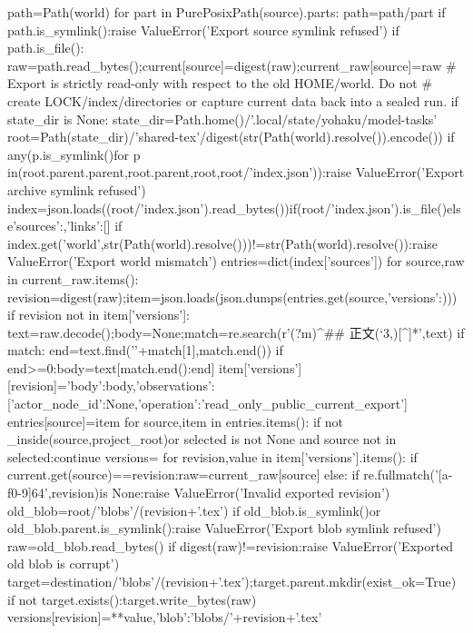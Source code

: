         path=Path(world)
        for part in PurePosixPath(source).parts:
            path=path/part
            if path.is_symlink():raise ValueError('Export source symlink refused')
        if path.is_file():
            raw=path.read_bytes();current[source]=digest(raw);current_raw[source]=raw
    # Export is strictly read-only with respect to the old HOME/world. Do not
    # create LOCK/index/directories or capture current data back into a sealed run.
    if state_dir is None:
        state_dir=Path.home()/'.local/state/yohaku/model-tasks'
    root=Path(state_dir)/'shared-tex'/digest(str(Path(world).resolve()).encode())
    if any(p.is_symlink()for p in(root.parent.parent,root.parent,root,root/'index.json')):raise ValueError('Export archive symlink refused')
    index=json.loads((root/'index.json').read_bytes())if(root/'index.json').is_file()else{'sources':{},'links':[]}
    if index.get('world',str(Path(world).resolve()))!=str(Path(world).resolve()):raise ValueError('Export world mismatch')
    entries=dict(index['sources'])
    for source,raw in current_raw.items():
        revision=digest(raw);item=json.loads(json.dumps(entries.get(source,{'versions':{}})))
        if revision not in item['versions']:
            text=raw.decode();body=None;match=re.search(r'(?m)^## 正文\s*\n(`{3,})[^\n]*\n',text)
            if match:
                end=text.find('\n'+match[1],match.end())
                if end>=0:body=text[match.end():end]
            item['versions'][revision]={'body':body,'observations':[{'actor_node_id':None,'operation':'read_only_public_current_export'}]}
        entries[source]=item
    for source,item in entries.items():
            if not _inside(source,project_root)or selected is not None and source not in selected:continue
            versions={}
            for revision,value in item['versions'].items():
                if current.get(source)==revision:raw=current_raw[source]
                else:
                    if re.fullmatch('[a-f0-9]{64}',revision)is None:raise ValueError('Invalid exported revision')
                    old_blob=root/'blobs'/(revision+'.tex')
                    if old_blob.is_symlink()or old_blob.parent.is_symlink():raise ValueError('Export blob symlink refused')
                    raw=old_blob.read_bytes()
                    if digest(raw)!=revision:raise ValueError('Exported old blob is corrupt')
                target=destination/'blobs'/(revision+'.tex');target.parent.mkdir(exist_ok=True)
                if not target.exists():target.write_bytes(raw)
                versions[revision]={**value,'blob':'blobs/'+revision+'.tex'}
